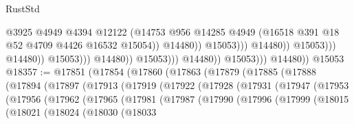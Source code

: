 \begin{lexlean}{RustStd}
\begin{coremodule}
                                                          @3925
                                                          @4949
                                                          @4394
                                                          @12122
                                                          (@14753
                                                            @956
                                                            @14285
                                                            @4949
                                                            (@16518
                                                              @391
                                                              @18
                                                              @52
                                                              @4709
                                                              @4426
                                                              @16532
                                                              @15054))
                                                          @14480))
                                                      @15053)))
                                                @14480))
                                            @15053)))
                                      @14480))
                                  @15053)))
                            @14480))
                        @15053)))
                  @14480))
              @15053)))
        @14480))
    @15053
@18357 := @17851
    (@17854
      (@17860
        (@17863
          (@17879
            (@17885
              (@17888
                (@17894
                  (@17897
                    (@17913
                      (@17919
                        (@17922
                          (@17928
                            (@17931
                              (@17947
                                (@17953
                                  (@17956
                                    (@17962
                                      (@17965
                                        (@17981
                                          (@17987
                                            (@17990
                                              (@17996
                                                (@17999
                                                  (@18015
                                                    (@18021
                                                      (@18024
                                                        (@18030
                                                          (@18033

\end{coremodule}
\end{lexlean}
